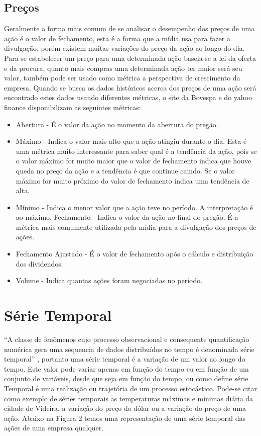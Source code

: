 \subsection{Preços}
Geralmente a forma mais comum de se analisar o desempenho dos preços de uma ação é o valor de fechamento, esta é a forma que a mídia usa para fazer a divulgação, porém existem muitas variações do preço da ação ao longo do dia. Para se estabelecer um preço para uma determinada ação baseia-se a lei da oferta e da procura, quanto mais compras uma determinada ação ter maior será seu valor, também pode ser usado como métrica a perspectiva de crescimento da empresa\cite{CITI}.  Quando se busca os dados históricos acerca dos preços de uma ação será encontrado estes dados usando diferentes métricas, o site da Bovespa e do yahoo finance disponibilizam as seguintes métricas:

 \begin{itemize}
	\item Abertura - É o valor da ação no momento da abertura do pregão.
    \item Máximo - Indica o valor mais alto que a ação atingiu durante o dia. Esta é uma métrica muito interessante para saber qual é a tendência da ação, pois se o valor máximo for muito maior que o valor de fechamento indica que houve queda no preço da ação e a tendência é que continue caindo. Se o valor máximo for muito próximo do valor de fechamento indica uma tendência de alta.
    \item Mínimo - Indica o menor valor que a ação teve no período. A interpretação é ao máximo.
    Fechamento - Indica o valor da ação no final do pregão. É a métrica mais comumente utilizada pela mídia para a divulgação dos preços de ações.
    \item Fechamento Ajustado - É o valor de fechamento após o cálculo e distribuição dos dividendos.
    \item Volume - Indica quantas ações foram negociadas no período.
\end{itemize}

\section{Série Temporal}
“A classe de fenômenos cujo processo observacional e consequente quantificação numérica gera uma sequencia de dados distribuídos no tempo é denominada série temporal” \cite{MUELLER}, portanto uma série temporal é a variação de um valor ao longo do tempo. Este valor pode variar apenas em função do tempo eu em função de um conjunto de variáveis, desde que seja em função do tempo\cite{AMADOR}, ou como  define série Temporal é uma realização ou trajetória de um processo estocástico. Pode-se citar como exemplo de séries temporais as temperaturas máximas e mínimas diária da cidade de Videira, a variação do preço do dólar ou a variação do preço de uma ação. Abaixo na Figura 2 temos uma representação de uma série temporal das ações de uma empresa qualquer.

